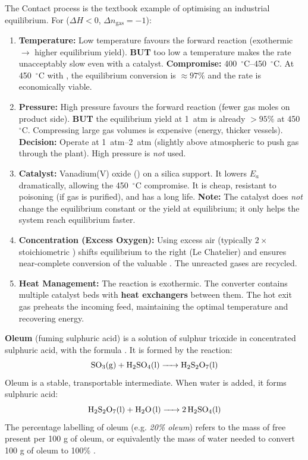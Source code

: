 \documentclass[11pt]{article}
\begin{document}
\begin{methode}
The Contact process is the textbook example of optimising an industrial equilibrium. For  ($\Delta H < 0$, $\Delta n_{\text{gas}} = -1$):

\begin{enumerate}
    \item \textbf{Temperature:} Low temperature favours the forward reaction (exothermic $\rightarrow$ higher equilibrium yield). \textbf{BUT} too low a temperature makes the rate unacceptably slow even with a catalyst. \textbf{Compromise:} \SIrange{400}{450}{\ensuremath{{}^{\circ}\mathrm{C}}}. At \SI{450}{\ensuremath{{}^{\circ}\mathrm{C}}} with , the equilibrium conversion is $\approx 97\%$ and the rate is economically viable.
    \item \textbf{Pressure:} High pressure favours the forward reaction (fewer gas moles on product side). \textbf{BUT} the equilibrium yield at \SI{1}{atm} is already $>95\%$ at \SI{450}{\ensuremath{{}^{\circ}\mathrm{C}}}. Compressing large gas volumes is expensive (energy, thicker vessels). \textbf{Decision:} Operate at \SIrange{1}{2}{atm} (slightly above atmospheric to push gas through the plant). High pressure is \emph{not} used.
    \item \textbf{Catalyst:} Vanadium(V) oxide () on a silica support. It lowers $E_a$ dramatically, allowing the \SI{450}{\ensuremath{{}^{\circ}\mathrm{C}}} compromise. It is cheap, resistant to poisoning (if gas is purified), and has a long life. \textbf{Note:} The catalyst does \emph{not} change the equilibrium constant or the yield at equilibrium; it only helps the system reach equilibrium faster.
    \item \textbf{Concentration (Excess Oxygen):} Using excess air (typically $2\times$ stoichiometric ) shifts equilibrium to the right (Le Chatelier) and ensures near-complete conversion of the valuable . The unreacted gases are recycled.
    \item \textbf{Heat Management:} The reaction is exothermic. The converter contains multiple catalyst beds with \textbf{heat exchangers} between them. The hot exit gas preheats the incoming feed, maintaining the optimal temperature and recovering energy.
\end{enumerate}
\end{methode}

\begin{definition}
\textbf{Oleum} (fuming sulphuric acid) is a solution of sulphur trioxide in concentrated sulphuric acid, with the formula . It is formed by the reaction:
\[
\ce{SO3(g) + H2SO4(l) -> H2S2O7(l)}
\]
Oleum is a stable, transportable intermediate. When water is added, it forms sulphuric acid:
\[
\ce{H2S2O7(l) + H2O(l) -> 2H2SO4(l)}
\]
The percentage labelling of oleum (e.g. \emph{20\% oleum}) refers to the mass of free  present per 100 g of oleum, or equivalently the mass of water needed to convert 100 g of oleum to 100\% .
\end{definition}
\end{document}
